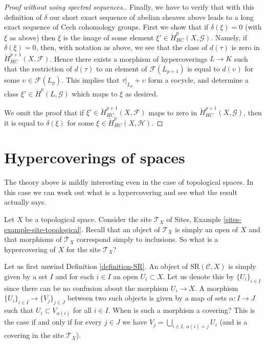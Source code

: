 \begin{proof}[Proof without using spectral sequences.]
\medskip\noindent
Finally, we have to verify that with this definition of $\delta$
our short exact sequence of abelian sheaves above leads to a
long exact sequence of Cech cohomology groups.
First we show that if $\delta(\xi) = 0$ (with $\xi$ as above) then
$\xi$ is the image of some element
$\xi' \in \check{H}^p_{HC}(X, \mathcal{G})$.
Namely, if $\delta(\xi) = 0$, then, with notation as above, we
see that the class of $d(\tau)$ is zero in
$\check{H}^{p + 1}_{HC}(X, \mathcal{F})$. Hence there exists
a morphism of hypercoverings $L \to K$ such that the restriction
of $d(\tau)$ to an element of $\mathcal{F}(L_{p + 1})$ is
equal to $d(\upsilon)$ for some $\upsilon \in \mathcal{F}(L_p)$.
This implies that $\tau|_{L_p} + \upsilon$ form a
cocycle, and determine a class $\xi' \in \check{H}^p(L, \mathcal{G})$
which maps to $\xi$ as desired.

\medskip\noindent
We omit the proof that if $\xi' \in \check{H}^{p + 1}_{HC}(X, \mathcal{F})$
maps to zero in $\check{H}^{p + 1}_{HC}(X, \mathcal{G})$, then it is
equal to $\delta(\xi)$ for some $\xi \in \check{H}^p_{HC}(X, \mathcal{H})$.
\end{proof}







\section{Hypercoverings of spaces}
\label{section-hypercoverings-spaces}

\noindent
The theory above is mildly interesting even in the case of topological
spaces. In this case we can work out what is a hypercovering and see
what the result actually says.

\medskip\noindent
Let $X$ be a topological space. Consider the site $\mathcal{T}_X$
of Sites, Example \ref{sites-example-site-topological}. Recall that
an object of $\mathcal{T}_X$ is simply an open of $X$ and that morphisms
of $\mathcal{T}_X$ correspond simply to inclusions. So what is a
hypercovering of $X$ for the site $\mathcal{T}_X$?

\medskip\noindent
Let us first unwind Definition \ref{definition-SR}.
An object of $\text{SR}(\mathcal{C}, X)$ is simply given by a set
$I$ and for each $i \in I$ an open $U_i \subset X$.
Let us denote this by $\{U_i\}_{i \in I}$ since there can be no
confusion about the morphism $U_i \to X$.
A morphism $\{U_i\}_{i \in I} \to \{V_j\}_{j \in J}$
between two such objects is given by a map of sets
$\alpha : I \to J$ such that $U_i \subset V_{\alpha(i)}$ for all
$i \in I$. When is such a morphism a covering? This is the case
if and only if for every $j \in J$ we have
$V_j = \bigcup_{i\in I, \ \alpha(i) = j} U_i$ (and is
a covering in the site $\mathcal{T}_X$).

